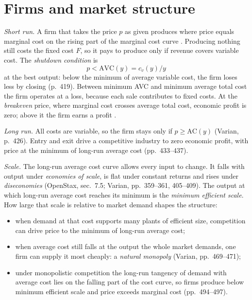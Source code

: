 \section{Firms and market structure}

\begin{qfmethod}\label{meth:cost-output-shutdown}
 \emph{Short run.} A firm that takes the price $p$ as given produces where price equals marginal cost on the rising part of the marginal cost curve \citep[pp.~416--418]{varian-microeconomics-2014}. Producing nothing still costs the fixed cost $F$, so it pays to produce only if revenue covers variable cost. The \emph{shutdown condition} is
\[ p<\mathrm{AVC}(y)=c_v(y)/y \]
at the best output: below the minimum of average variable cost, the firm loses less by closing (p.~419). Between minimum AVC and minimum average total cost the firm operates at a loss, because each sale contributes to fixed costs. At the \emph{breakeven} price, where marginal cost crosses average total cost, economic profit is zero; above it the firm earns a profit \citep[sec.~8.2]{openstax-microeconomics-3e}.

\emph{Long run.} All costs are variable, so the firm stays only if $p\geq\mathrm{AC}(y)$ (Varian, p.~426). Entry and exit drive a competitive industry to zero economic profit, with price at the minimum of long-run average cost (pp.~433--437).

\emph{Scale.} The long-run average cost curve allows every input to change. It falls with output under \emph{economies of scale}, is flat under constant returns and rises under \emph{diseconomies} (OpenStax, sec.~7.5; Varian, pp.~359--361, 405--409). The output at which long-run average cost reaches its minimum is the \emph{minimum efficient scale}. How large that scale is relative to market demand shapes the structure:
\begin{itemize}
\item when demand at that cost supports many plants of efficient size, competition can drive price to the minimum of long-run average cost;
\item when average cost still falls at the output the whole market demands, one firm can supply it most cheaply: a \emph{natural monopoly} (Varian, pp.~469--471);
\item under monopolistic competition the long-run tangency of demand with average cost lies on the falling part of the cost curve, so firms produce below minimum efficient scale and price exceeds marginal cost (pp.~494--497).
\end{itemize}


\end{qfmethod}

